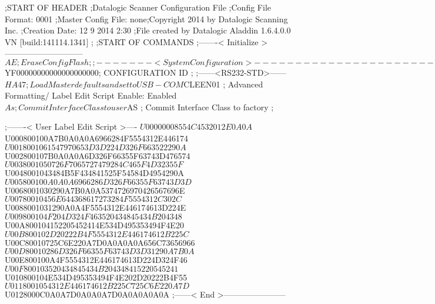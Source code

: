 ;START OF HEADER
;Datalogic Scanner Configuration File
;Config File Format: 0001
;Master Config File: none;Copyright 2014 by Datalogic Scanning Inc.
;Creation Date: 12 9 2014 2:30
;File created by Datalogic Aladdin 1.6.4.0.0 VN [build:141114.1341]
;
;START OF COMMANDS
;-------< Initialize >-----------------------------
$AE                 ; Erase Config Flash
;
;-------< System Configuration >-------------------------------
$YF00000000000000000000; CONFIGURATION ID
;
;------<RS232-STD>------
$HA47               ; Load Master defaults and set to USB-COM
$CLEEN01            ; Advanced Formatting/ Label Edit Script Enable: Enabled
$As                 ; Commit Interface Class to user
$AS                 ; Commit Interface Class to factory
;

;-------< User Label Edit Script >----
$U00000008554C4532012E0A0A
$U000800100A7B0A0A0A6966284F5554312E446174
$U0018001061547970653D3D224D326F663522290A
$U002800107B0A0A0A6D326F66355F63743D476574
$U0038001050726F7065727479284C465F4D32355F
$U0048001043484B5F434841525F54584D4954290A
$U005800100A0A0A6966286D326F66355F63743D3D
$U0068001030290A7B0A0A5374726970426567696E
$U00780010456E644368617273284F5554312C302C
$U0088001031290A0A4F5554312E446174613D224E
$U009800104F204D324F463520434845434B204348
$U00A800104152205452414E534D495353494F4E20
$U00B800102D20222B4F5554312E446174612B225C
$U00C80010725C6E220A7D0A0A0A0A656C73656966
$U00D80010286D326F66355F63743D3D31290A7B0A
$U00E800100A4F5554312E446174613D224D324F46
$U00F800103520434845434B204348415220545241
$U010800104E534D495353494F4E202D20222B4F55
$U0118001054312E446174612B225C725C6E220A7D
$U0128000C0A0A7D0A0A0A7D0A0A0A0A0A
;------< End >-----------------------

